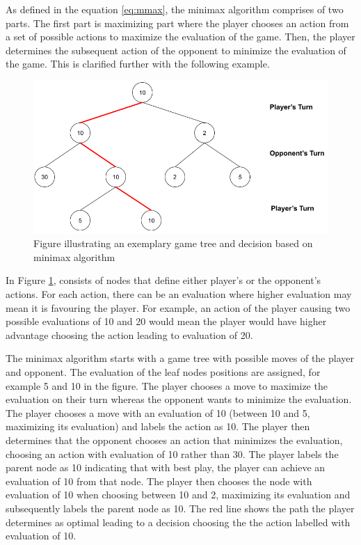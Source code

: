 As defined in the equation \eqref{eq:mmax}, the minimax algorithm comprises of two parts. The first part is maximizing part where the player chooses an action from a set of possible actions to maximize the evaluation of the game. Then, the player determines the subsequent action of the opponent to minimize the evaluation of the game. This is clarified further with the following example.

\begin{figure}
    \centering
    \includegraphics[width=\linewidth]{../img/Minimax1.png}
    \caption{Figure illustrating an exemplary game tree and decision based on minimax algorithm}
    \label{fig:minimax1}
\end{figure}

In Figure \ref{fig:minimax1}, consists of nodes that define either player's or the opponent's actions. For each action, there can be an evaluation where higher evaluation may mean it is favouring the player. For example, an action of the player causing two possible evaluations of 10 and 20 would mean the player would have higher advantage choosing the action leading to evaluation of 20. 

The minimax algorithm starts with a game tree with possible moves of the player and opponent. The evaluation of the leaf nodes positions are assigned, for example 5 and 10 in the figure. The player chooses a move to maximize the evaluation on their turn whereas the opponent wants to minimize the evaluation. The player chooses a move with an evaluation of 10 (between 10 and 5, maximizing its evaluation) and labels the action as 10. The player then determines that the opponent chooses an action that minimizes the evaluation, choosing an action with evaluation of 10 rather than 30. The player labels the parent node as 10 indicating that with best play, the player can achieve an evaluation of 10 from that node. The player then chooses the node with evaluation of 10 when choosing between 10 and 2, maximizing its evaluation and subsequently labels the parent node as 10. The red line shows the path the player determines as optimal leading to a decision choosing the the action labelled with evaluation of 10.

